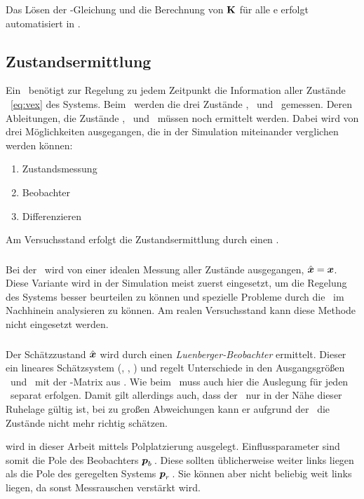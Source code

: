 Das Lösen der \ricc-Gleichung und die Berechnung von ${\boldsymbol{\mathrm{K}}}$ für alle \ap e erfolgt automatisiert in \ml.


\subsection{Zustandsermittlung}\label{subsec:zse} 

Ein \zsr\ benötigt zur Regelung zu jedem Zeitpunkt die Information aller Zustände \vex\ \eqref{eq:vex} des Systems. Beim \spds\ werden die drei Zustände \xo, \phe\ und \phz\ gemessen. Deren Ableitungen, die Zustände \xop, \phep\ und \phzp\ müssen noch ermittelt werden. Dabei wird von drei Möglichkeiten ausgegangen, die in der Simulation miteinander verglichen werden können:
\begin{enumerate}
	\item Zustandsmessung
	\item Beobachter
	\item Differenzieren 
\end{enumerate}
Am Versuchsstand erfolgt die Zustandsermittlung durch einen \beob.

\subsubsection{\zm}
Bei der \zm\ wird von einer idealen Messung aller Zustände ausgegangen, \dah $\hat{\boldsymbol{x}}=\boldsymbol{x}$. 
Diese Variante wird in der Simulation meist zuerst eingesetzt, um die Regelung des Systems besser beurteilen zu können und spezielle Probleme durch die \ze\ im Nachhinein analysieren zu können.
Am realen Versuchsstand kann diese Methode nicht eingesetzt werden.

\subsubsection{\beob}\label{subsec:beob}
Der Schätzzustand $\hat{\boldsymbol{x}}$ wird durch einen \emph{Luenberger-Beobachter} ermittelt. 
Dieser  ein lineares Schätzsystem (, , ) und regelt Unterschiede in den Ausgangsgrößen \vey\ und \veyd\ mit der \beob-Matrix  aus \cite{AdamyRT2}. 
Wie beim \zsr\ muss auch hier die Auslegung für jeden \ap\ separat erfolgen.
Damit gilt allerdings auch, dass der \beob\ nur in der Nähe dieser Ruhelage gültig ist, bei zu großen Abweichungen kann er aufgrund der \lin\ die Zustände nicht mehr richtig schätzen.

 wird in dieser Arbeit mittels Polplatzierung ausgelegt. 
Einflussparameter sind somit die Pole des Beobachters $\boldsymbol{p}_b$\,. 
Diese sollten üblicherweise weiter links liegen als die Pole des geregelten Systems $\boldsymbol{p}_r$\,. 
Sie können aber nicht beliebig weit links liegen, da sonst Messrauschen verstärkt wird.

